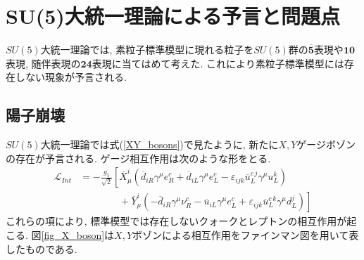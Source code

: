 \section{SU(5)大統一理論による予言と問題点}
$SU(5)$大統一理論では, 素粒子標準模型に現れる粒子を$SU(5)$群の$\overline{\bm{5}}$表現や$\bm{10}$表現, 随伴表現の$\bm{24}$表現に当てはめて考えた.
これにより素粒子標準模型には存在しない現象が予言される.
\subsection{陽子崩壊}
$SU(5)$大統一理論では式(\ref{XY_bosons})で見たように, 新たに$X, Y$ゲージボゾンの存在が予言される.
ゲージ相互作用は次のような形をとる.
\begin{align}
  \mathcal{L}_{Int} &= -\frac{g_5}{\sqrt{2}}\left[ \overline{X}_\mu^i(\overline{d}_{iR}\gamma^\mu e^c_R + \overline{d}_{iL}\gamma^\mu e^c_L -\varepsilon_{ijk} \overline{u}_L^{c\,j}\gamma^\mu u_L^k) \right.\nonumber\\ &\qquad\qquad+\left.\overline{Y}_\mu^i(-\overline{d}_{iR}\gamma^\mu \nu_R^c -\overline{u}_{iL}\gamma^\mu e_L^c + \varepsilon_{ijk}\overline{u}_L^{c\,k}\gamma^\mu d_L^j)\right] \label{PD_L}
\end{align}
これらの項により, 標準模型では存在しないクォークとレプトンの相互作用が起こる.
図\ref{fig_X_boson}は$X, Y$ボゾンによる相互作用をファインマン図を用いて表したものである.
